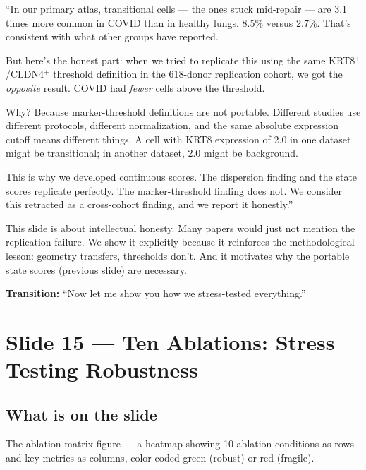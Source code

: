 \documentclass[11pt]{article}
\begin{document}
\begin{speaknote}
``In our primary atlas, transitional cells --- the ones stuck mid-repair --- are 3.1 times more common in COVID than in healthy lungs. 8.5\% versus 2.7\%. That's consistent with what other groups have reported.

But here's the honest part: when we tried to replicate this using the same KRT8$^+$/CLDN4$^+$ threshold definition in the 618-donor replication cohort, we got the \emph{opposite} result. COVID had \emph{fewer} cells above the threshold.

Why? Because marker-threshold definitions are not portable. Different studies use different protocols, different normalization, and the same absolute expression cutoff means different things. A cell with KRT8 expression of 2.0 in one dataset might be transitional; in another dataset, 2.0 might be background.

This is why we developed continuous scores. The dispersion finding and the state scores replicate perfectly. The marker-threshold finding does not. We consider this retracted as a cross-cohort finding, and we report it honestly.''
\end{speaknote}

\begin{whyblock}
This slide is about intellectual honesty. Many papers would just not mention the replication failure. We show it explicitly because it reinforces the methodological lesson: geometry transfers, thresholds don't. And it motivates why the portable state scores (previous slide) are necessary.
\end{whyblock}

\textbf{Transition:} ``Now let me show you how we stress-tested everything.''


\section{Slide 15 --- Ten Ablations: Stress Testing Robustness}

\subsection{What is on the slide}

The ablation matrix figure --- a heatmap showing 10 ablation conditions as rows and key metrics as columns, color-coded green (robust) or red (fragile).
\end{document}
